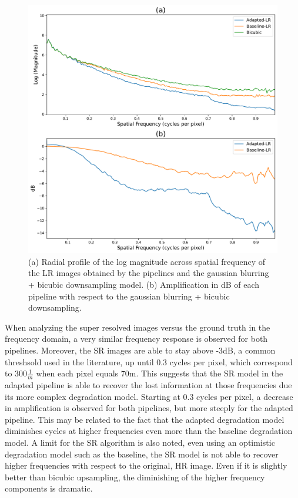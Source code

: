         \begin{figure}[H]
            \centering
            \includegraphics[scale=0.45]{Includes/5-lr-images-fft-comparison.pdf}
            \caption{(a) Radial profile of the log magnitude across spatial frequency of the LR images obtained by the pipelines and the gaussian blurring + bicubic downsampling model.
                     (b) Amplification in dB of each pipeline with respect to the gaussian blurring + bicubic downsampling.}
            \label{fig:5-lr-images-fft-comparison.pdf}
        \end{figure}

        When analyzing the super resolved images versus the ground truth in the frequency domain, a very similar frequency response is observed for both pipelines.
        Moreover, the SR images are able to stay above -3dB, a common threshsold used in the literature, up until 0.3 cycles per pixel, which correspond to 300$\frac{1}{m}$ when each pixel equals 70m.
        This suggests that the SR model in the adapted pipeline is able to recover the lost information at those frequencies due its more complex degradation model.
        Starting at 0.3 cycles per pixel, a decrease in amplification is observed for both pipelines, but more steeply for the adapted pipeline.
        This may be related to the fact that the adapted degradation model diminishes cycles at higher frequencies even more than the baseline degradation model. 
        A limit for the SR algorithm is also noted, even using an optimistic degradation model such as the baseline, the SR model is not able to recover higher frequencies with respect to the original, HR image.
        Even if it is slightly better than bicubic upsampling, the diminishing of the higher frequency components is dramatic.

